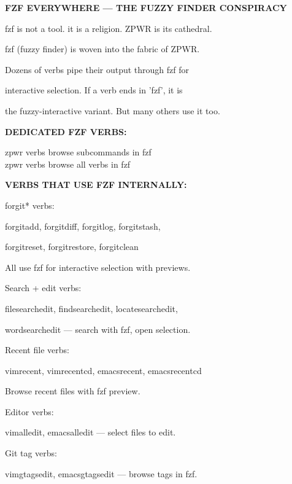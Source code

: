 \documentclass[11pt,a4paper,twoside]{book}
\begin{document}
\vspace{10pt}
{\large\bfseries\color{neoncyan} FZF EVERYWHERE — THE FUZZY FINDER CONSPIRACY}\vspace{6pt}

fzf is not a tool. it is a religion. ZPWR is its cathedral.

fzf (fuzzy finder) is woven into the fabric of ZPWR.

\begin{codebox}
Dozens of verbs pipe their output through fzf for\\
\end{codebox}

interactive selection. If a verb ends in 'fzf', it is

the fuzzy-interactive variant. But many others use it too.


\vspace{12pt}
{\bfseries\color{neonyellow} DEDICATED FZF VERBS:}\vspace{4pt}

\begin{codebox}
zpwr verbs     browse subcommands in fzf\\
zpwr verbs           browse all verbs in fzf\\
\end{codebox}


\vspace{12pt}
{\bfseries\color{neonyellow} VERBS THAT USE FZF INTERNALLY:}\vspace{4pt}

forgit* verbs:

forgitadd, forgitdiff, forgitlog, forgitstash,

forgitreset, forgitrestore, forgitclean

All use fzf for interactive selection with previews.

Search + edit verbs:

filesearchedit, findsearchedit, locatesearchedit,

wordsearchedit — search with fzf, open selection.

Recent file verbs:

vimrecent, vimrecentcd, emacsrecent, emacsrecentcd

Browse recent files with fzf preview.

Editor verbs:

vimalledit, emacsalledit — select files to edit.

Git tag verbs:

vimgtagsedit, emacsgtagsedit — browse tags in fzf.
\end{document}

